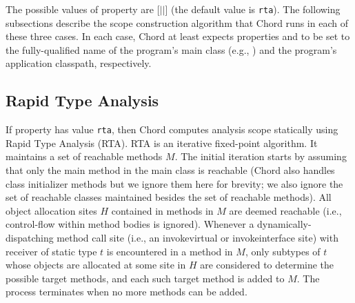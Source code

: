 The possible values of property  are
[$|$$|$] (the default value is {\tt rta}).
The following subsections describe the scope construction algorithm
that Chord runs in each of these three cases.
In each case, Chord at
least expects properties  and
 to be set to the fully-qualified name of the
program's main class (e.g., ) and the
program's application classpath, respectively.

\subsection{Rapid Type Analysis}

If property  has value {\tt rta}, then Chord
computes analysis scope statically using Rapid Type Analysis (RTA).
RTA is an iterative fixed-point algorithm.  It maintains a set of
reachable methods $M$.  The initial iteration starts by assuming that
only the main method in the main class is reachable (Chord also
handles class initializer methods but we ignore them here for brevity;
we also ignore the set of reachable classes maintained besides the set
of reachable methods).  All object allocation sites $H$ contained in
methods in $M$ are deemed reachable (i.e., control-flow within method
bodies is ignored).  Whenever a dynamically-dispatching method call
site (i.e., an invokevirtual or invokeinterface site) with receiver of
static type $t$ is encountered in a method in $M$, only subtypes of
$t$ whose objects are allocated at some site in $H$ are considered to
determine the possible target methods, and each such target method is
added to $M$.  The process terminates when no more methods can be
added.


